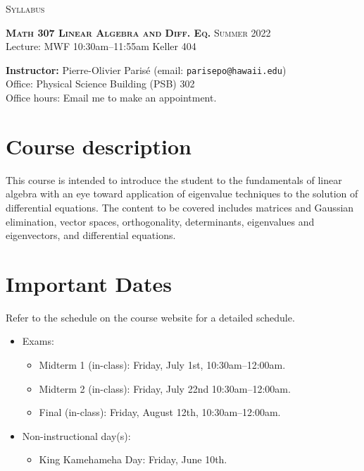 \documentclass[12pt]{amsart}
\newcommand{\spacer}{\vspace{.2cm}}
\begin{document}
\begin{center}
\Large{\textsc{Syllabus}}
\end{center}

\noindent\hrulefill

\noindent\textbf{\textsc{Math 307 Linear Algebra and Diff. Eq.}} \hfill \textsc{Summer 2022}\\
Lecture: MWF 10:30am--11:55am \hfill Keller 404

\noindent\hrulefill

\spacer

\noindent\textbf{Instructor:} Pierre-Olivier Parisé (email: \texttt{parisepo@hawaii.edu})\\
Office: Physical Science Building (PSB) 302\\
Office hours: Email me to make an appointment.

\section*{Course description}
This course is intended to introduce the student to the fundamentals of linear algebra with an eye toward application of eigenvalue techniques to the solution of differential equations. The content to be covered includes matrices and Gaussian elimination, vector spaces, orthogonality, determinants, eigenvalues and eigenvectors, and differential equations.

\section*{Important Dates}
Refer to the schedule on the course website for a detailed schedule.
	\begin{itemize}
	\item Exams:
		\begin{itemize}
		\item Midterm 1 (in-class): Friday, July 1st, 10:30am--12:00am.
		\item Midterm 2 (in-class): Friday, July 22nd 10:30am--12:00am.
		\item Final (in-class): Friday, August 12th, 10:30am--12:00am.
		\end{itemize}
	\item Non-instructional day(s):
		\begin{itemize}
		\item King Kamehameha Day: Friday, June 10th.
		\end{itemize}
	\end{itemize}
\end{document}
